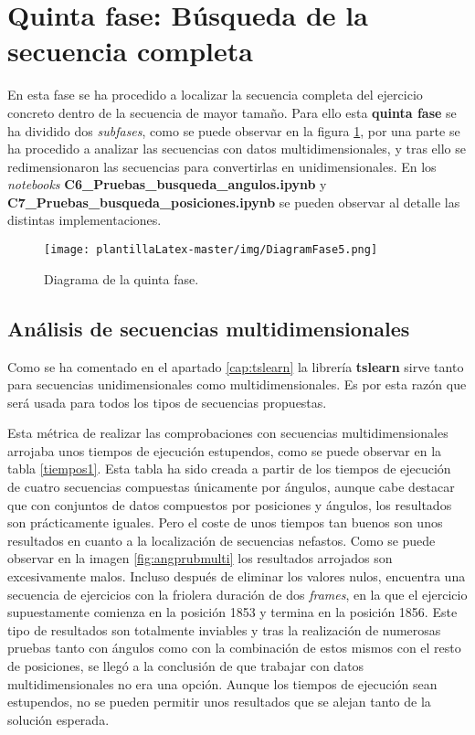\section{Quinta fase: Búsqueda de la secuencia completa}

En esta fase se ha procedido a localizar la secuencia completa del ejercicio concreto dentro de la secuencia de mayor tamaño. Para ello esta \textbf{quinta fase} se ha dividido dos \textit{subfases}, como se puede observar en la figura \ref{fig:fase5}, por una parte se ha procedido a analizar las secuencias con datos multidimensionales, y tras ello se redimensionaron las secuencias para convertirlas en unidimensionales. En los \textit{notebooks} \textbf{C6\_Pruebas\_busqueda\_angulos.ipynb} y \textbf{C7\_Pruebas\_busqueda\_posiciones.ipynb} se pueden observar al detalle las distintas implementaciones. 

\begin{figure}[H]
    \centering
    \texttt{[image: plantillaLatex-master/img/DiagramFase5.png]}
    \caption{Diagrama de la quinta fase.}
    \label{fig:fase5}
\end{figure}

\subsection{Análisis de secuencias multidimensionales}

Como se ha comentado en el apartado \ref{cap:tslearn} la librería \textbf{tslearn} sirve tanto para secuencias unidimensionales como multidimensionales. Es por esta razón que será usada para todos los tipos de secuencias propuestas. 

Esta métrica de realizar las comprobaciones con secuencias multidimensionales arrojaba unos tiempos de ejecución estupendos, como se puede observar en la tabla \ref{tiempos1}. Esta tabla ha sido creada a partir de los tiempos de ejecución de cuatro secuencias compuestas únicamente por ángulos, aunque cabe destacar que con conjuntos de datos compuestos por posiciones y ángulos, los resultados son prácticamente iguales. Pero el coste de unos tiempos tan buenos son unos resultados en cuanto a la localización de secuencias nefastos. Como se puede observar en la imagen \ref{fig:angprubmulti} los resultados arrojados son excesivamente malos. Incluso después de eliminar los valores nulos, encuentra una secuencia de ejercicios con la friolera duración de dos \textit{frames}, en la que el ejercicio supuestamente comienza en la posición 1853 y termina en la posición 1856. Este tipo de resultados son totalmente inviables y tras la realización de numerosas pruebas tanto con ángulos como con la combinación de estos mismos con el resto de posiciones, se llegó a la conclusión de que trabajar con datos multidimensionales no era una opción. Aunque los tiempos de ejecución sean estupendos, no se pueden permitir unos resultados que se alejan tanto de la solución esperada. 

